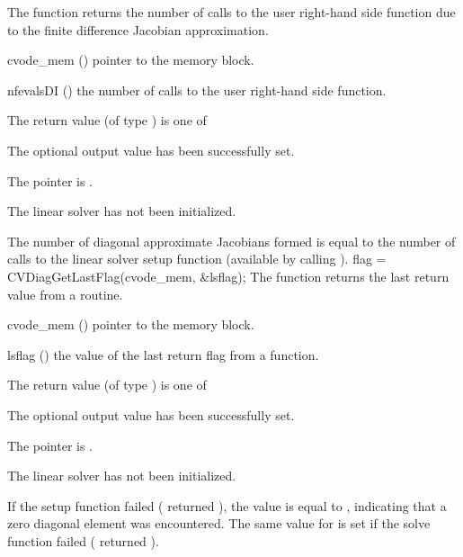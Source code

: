 {
  The function  returns the
  number of calls to the user right-hand side function due to the 
  finite difference Jacobian approximation.
}
{
  \begin{args}
  \item[cvode\_mem] ()
    pointer to the {\cvode} memory block.
  \item[nfevalsDI] ()
    the number of calls to the user right-hand side function.
  \end{args}
}
{
  The return value  (of type ) is one of
  \begin{args}
  \item[\Id{CVDIAG\_SUCCESS}] 
    The optional output value has been successfully set.
  \item[\Id{CVDIAG\_MEM\_NULL}]
    The  pointer is .
  \item[\Id{CVDIAG\_LMEM\_NULL}]
    The {\cvdiag} linear solver has not been initialized.
  \end{args}
}
{
  The number of diagonal approximate Jacobians formed is
  equal to the number of calls to the linear solver setup function
  (available by calling ).
}
{
  flag = CVDiagGetLastFlag(cvode\_mem, \&lsflag);
}
{
  The function  returns the
  last return value from a {\cvdiag} routine. 
}
{
  \begin{args}
  \item[cvode\_mem] ()
    pointer to the {\cvode} memory block.
  \item[lsflag] ()
    the value of the last return flag from a {\cvdiag} function.
  \end{args}
}
{
  The return value  (of type ) is one of
  \begin{args}
  \item[\Id{CVDIAG\_SUCCESS}] 
    The optional output value has been successfully set.
  \item[\Id{CVDIAG\_MEM\_NULL}]
    The  pointer is .
  \item[\Id{CVDIAG\_LMEM\_NULL}]
    The {\cvdiag} linear solver has not been initialized.
  \end{args}
}
{
  If the {\cvdiag} setup function failed ( returned ),
  the value  is equal to , indicating that a zero
  diagonal element was encountered.
  The same value for  is set if the {\cvdiag} solve function failed
  ( returned ).
}

